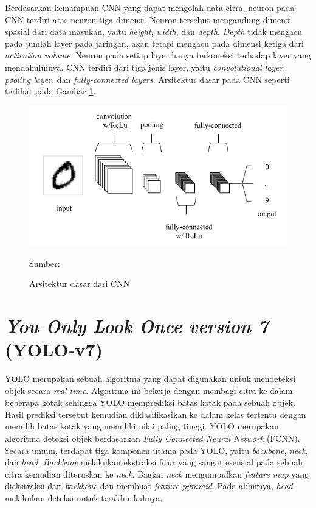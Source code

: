 Berdasarkan kemampuan CNN yang dapat mengolah data citra, neuron pada CNN terdiri atas neuron tiga dimensi. Neuron tersebut mengandung dimensi spasial dari data masukan, yaitu \textit{height}, \textit{width}, dan \textit{depth}. \textit{Depth} tidak mengacu pada jumlah layer pada jaringan, akan tetapi mengacu pada dimensi ketiga dari \textit{activation volume}. Neuron pada setiap layer hanya terkoneksi terhadap layer yang mendahuluinya. CNN terdiri dari tiga jenis layer, yaitu \textit{convolutional layer}, \textit{pooling layer}, dan \textit{fully-connected layers}. Arsitektur dasar pada CNN seperti terlihat pada Gambar \ref{fig:cnn}.

\begin{figure}[H]
    \begin{center}
        \includegraphics[width=12cm]{../img/CNN Basic - Latex.png}
        \caption{Arsitektur dasar dari CNN}
        \label{fig:cnn}
        Sumber: \citep{OShea2015}
    \end{center}
\end{figure}

\section{\textit{You Only Look Once version 7} (YOLO-v7)}
YOLO merupakan sebuah algoritma yang dapat digunakan untuk mendeteksi objek secara \textit{real time}. Algoritma ini bekerja dengan membagi citra ke dalam beberapa kotak sehingga YOLO memprediksi batas kotak pada sebuah objek. Hasil prediksi tersebut kemudian diklasifikasikan ke dalam kelas tertentu dengan memilih batas kotak yang memiliki nilai paling tinggi. YOLO merupakan algoritma deteksi objek berdasarkan \textit{Fully Connected Neural Network} (FCNN). Secara umum, terdapat tiga komponen utama pada YOLO, yaitu \textit{backbone}, \textit{neck}, dan \textit{head}. \textit{Backbone} melakukan ekstraksi fitur yang sangat esensial pada sebuah citra kemudian diteruskan ke \textit{neck}. Bagian \textit{neck} mengumpulkan \textit{feature map} yang diekstraksi dari \textit{backbone} dan membuat \textit{feature pyramid}. Pada akhirnya, \textit{head} melakukan deteksi untuk terakhir kalinya.

